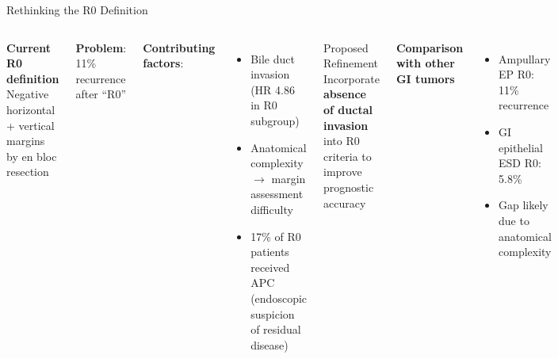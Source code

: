 \documentclass[aspectratio=169,10pt]{beamer}
\renewcommand{\neg}[1]{\textcolor{negative}{#1}}
\begin{document}
\begin{frame}{Rethinking the R0 Definition}
\begin{columns}[T]
\textbf{Current R0 definition}\\
Negative horizontal + vertical margins by en bloc resection

\vspace{6pt}
\textbf{Problem}: 11\% recurrence after ``R0''

\vspace{4pt}
\textbf{Contributing factors}:
\begin{itemize}
  \item \neg{Bile duct invasion} (HR 4.86 in R0 subgroup)
  \item Anatomical complexity $\to$ margin assessment difficulty
  \item 17\% of R0 patients received APC (endoscopic suspicion of residual disease)
\end{itemize}

\begin{alertblock}{Proposed Refinement}
  Incorporate \textbf{absence of ductal invasion} into R0 criteria to improve prognostic accuracy
\end{alertblock}

\vspace{6pt}
\textbf{Comparison with other GI tumors}
\begin{itemize}
  \item Ampullary EP R0: 11\% recurrence
  \item GI epithelial ESD R0: 5.8\%
  \item Gap likely due to anatomical complexity
\end{itemize}
\end{columns}
\end{frame}
\end{document}
